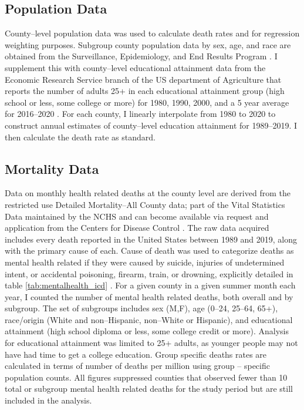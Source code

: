 \documentclass[12pt, a4paper]{article}
\begin{document}
\subsection{Population Data}
County--level population data was used to calculate death rates and for regression weighting purposes. Subgroup county population data by sex, age, and race are obtained from the Surveillance, Epidemiology, and End Results Program \cite{seerPop2022}. I supplement this with county--level educational attainment data from the Economic Research Service branch of the US department of Agriculture that reports the number of adults 25+ in each educational attainment group (high school or less, some college or more) for 1980, 1990, 2000, and a 5 year average for 2016--2020 \cite{ersEducation2022}. For each county, I linearly interpolate from 1980 to 2020 to construct annual estimates of county--level education attainment for 1989--2019. I then calculate the death rate as standard.

\subsection{Mortality Data}
Data on monthly health related deaths at the county level are derived from the restricted use Detailed Mortality--All County data; part of the Vital Statistics Data maintained by the NCHS and can become available via request and application from the Centers for Disease Control \cite{nchsRestrictedData2021}. The raw data acquired includes every death reported in the United States between 1989 and 2019, along with the primary cause of each. Cause of death was used to categorize deaths as mental health related if they were caused by suicide, injuries of undetermined intent, or accidental poisoning, firearm, train, or drowning, explicitly detailed in table \ref{tab:mentalhealth_icd} \cite{MHClassification}. For a given county in a given summer month each year, I counted the number of mental health related deaths, both overall and by subgroup. The set of subgroups includes sex (M,F), age (0--24, 25--64, 65+), race/origin (White and non--Hispanic, non--White or Hispanic), and educational attainment (high school diploma or less, some college credit or more). Analysis for educational attainment was limited to 25+ adults, as younger people may not have had time to get a college education. Group specific deaths rates are calculated in terms of number of deaths per million using group -- specific population counts. All figures suppressed counties that observed fewer than 10 total or subgroup mental health related deaths for the study period but are still included in the analysis.
\end{document}
